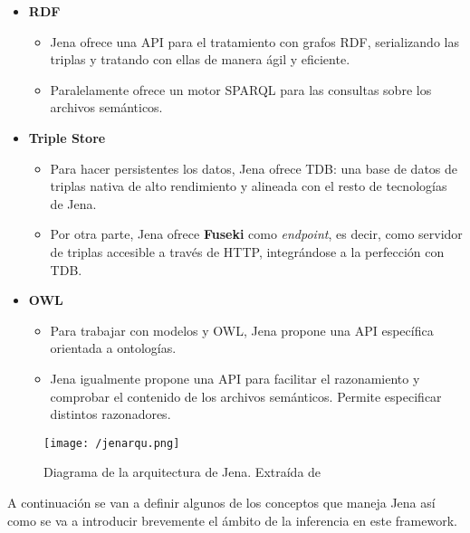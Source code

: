 \begin{itemize}
\item \textbf{RDF}
  \begin{itemize}
  \item Jena ofrece una \acs{API} para el tratamiento con grafos \acs{RDF},
    serializando las triplas y tratando con ellas de manera ágil y eficiente. 
  \item Paralelamente ofrece un motor \acs{SPARQL} para las consultas sobre los
    archivos semánticos. 
  \end{itemize}
\item \textbf{Triple Store}
  \begin{itemize}
  \item Para hacer persistentes los datos, Jena ofrece \acf{TDB}: una base de
    datos de triplas nativa de alto rendimiento y alineada con el resto de
    tecnologías de Jena. 
  \item Por otra parte, Jena ofrece \textbf{Fuseki} como \textit{endpoint}, es
    decir, como servidor de triplas accesible a través de \acs{HTTP},
    integrándose a la perfección con \acs{TDB}.\label{sbs:fuseki}
  \end{itemize}

\item \textbf{OWL}
  \begin{itemize}
  \item Para trabajar con modelos y \acs{OWL}, Jena propone una \acs{API} específica
    orientada a ontologías. 
  \item Jena igualmente propone una \acs{API} para facilitar el razonamiento y
    comprobar el contenido de los archivos semánticos. Permite especificar
    distintos razonadores. 
  \end{itemize}
\end{itemize}


\begin{figure}[!h]
  \begin{center}
    \texttt{[image: /jenarqu.png]} 
    \caption{Diagrama de la arquitectura de Jena. Extraída de \cite{JENA}}
    \label{fig:jenarquitectura}
  \end{center}
\end{figure}



A continuación se van a definir algunos de los conceptos que maneja Jena así
como se va a introducir brevemente el ámbito de la inferencia en este
framework. 

